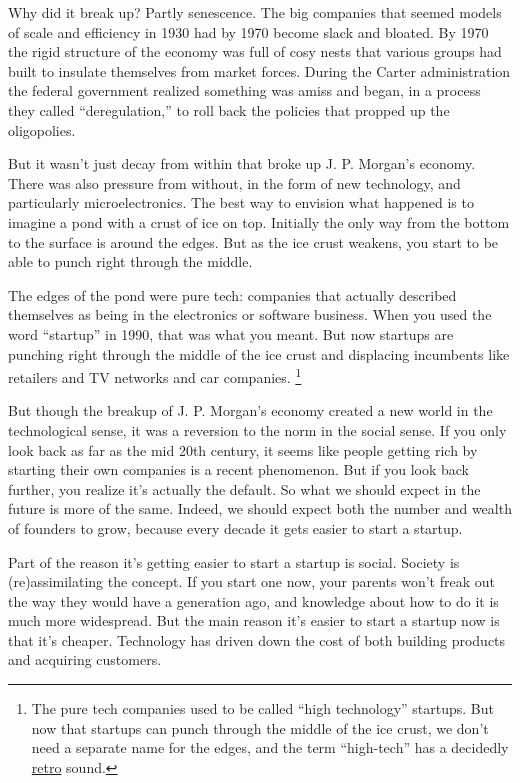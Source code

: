 \documentclass[12pt]{book}
\begin{document}
Why did it break up? Partly senescence. The big companies that seemed
models of scale and efficiency in 1930 had by 1970 become slack and
bloated. By 1970 the rigid structure of the economy was full of cosy
nests that various groups had built to insulate themselves from market
forces. During the Carter administration the federal government realized
something was amiss and began, in a process they called
``deregulation,'' to roll back the policies that propped up the
oligopolies.

But it wasn't just decay from within that broke up J. P. Morgan's
economy. There was also pressure from without, in the form of new
technology, and particularly microelectronics. The best way to envision
what happened is to imagine a pond with a crust of ice on top. Initially
the only way from the bottom to the surface is around the edges. But as
the ice crust weakens, you start to be able to punch right through the
middle.

The edges of the pond were pure tech: companies that actually described
themselves as being in the electronics or software business. When you
used the word ``startup'' in 1990, that was what you meant. But now
startups are punching right through the middle of the ice crust and
displacing incumbents like retailers and TV networks and car companies.
\footnote{The pure tech companies used to be called ``high technology''
startups. But now that startups can punch through the middle of the ice
crust, we don't need a separate name for the edges, and the term
``high-tech'' has a decidedly
\href{https://books.google.com/ngrams/graph?content=high+tech&year_start=1900&year_end=2019&corpus=en-2019&smoothing=3}{retro}
sound.}

But though the breakup of J. P. Morgan's economy created a new world in
the technological sense, it was a reversion to the norm in the social
sense. If you only look back as far as the mid 20th century, it seems
like people getting rich by starting their own companies is a recent
phenomenon. But if you look back further, you realize it's actually the
default. So what we should expect in the future is more of the same.
Indeed, we should expect both the number and wealth of founders to grow,
because every decade it gets easier to start a startup.

Part of the reason it's getting easier to start a startup is social.
Society is (re)assimilating the concept. If you start one now, your
parents won't freak out the way they would have a generation ago, and
knowledge about how to do it is much more widespread. But the main
reason it's easier to start a startup now is that it's cheaper.
Technology has driven down the cost of both building products and
acquiring customers.
\end{document}

